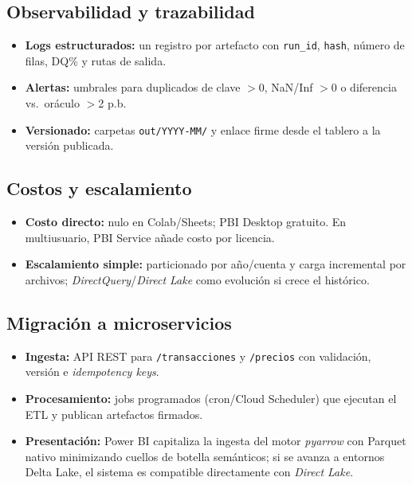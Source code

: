 \documentclass[conference]{IEEEtran}
\begin{document}
\subsection{Observabilidad y trazabilidad}
\begin{itemize}
    \item \textbf{Logs estructurados:} un registro por artefacto con \texttt{run\_id}, \texttt{hash}, número de filas, DQ\% y rutas de salida.
    \item \textbf{Alertas:} umbrales para duplicados de clave $>$0, NaN/Inf $>$0 o diferencia vs.\ oráculo $>$2 p.b.
    \item \textbf{Versionado:} carpetas \texttt{out/YYYY-MM/} y enlace firme desde el tablero a la versión publicada.
\end{itemize}

\subsection{Costos y escalamiento}
\begin{itemize}
    \item \textbf{Costo directo:} nulo en Colab/Sheets; PBI Desktop gratuito. En multiusuario, PBI Service añade costo por licencia.
    \item \textbf{Escalamiento simple:} particionado por año/cuenta y carga incremental por archivos; \emph{DirectQuery}/\emph{Direct Lake} como evolución si crece el histórico.
\end{itemize}

\subsection{Migración a microservicios}
\begin{itemize}
    \item \textbf{Ingesta:} API REST para \texttt{/transacciones} y \texttt{/precios} con validación, versión e \emph{idempotency keys}.
    \item \textbf{Procesamiento:} jobs programados (cron/Cloud Scheduler) que ejecutan el ETL y publican artefactos firmados.
    \item \textbf{Presentación:} Power BI capitaliza la ingesta del motor \emph{pyarrow} con Parquet nativo minimizando cuellos de botella semánticos; si se avanza a entornos Delta Lake, el sistema es compatible directamente con \emph{Direct Lake}.
\end{itemize}

\end{document}
